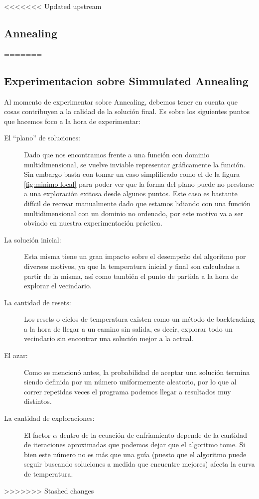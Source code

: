 <<<<<<< Updated upstream
\subsection{Annealing}
=======
\subsection{Experimentacion sobre Simmulated Annealing}

Al momento de experimentar sobre Annealing, debemos tener en cuenta que cosas contribuyen a la calidad de la solución final. Es sobre los siguientes puntos que hacemos foco a la hora de experimentar:

\begin{description}
\item[El “plano” de soluciones:] Dado que nos encontramos frente a una función con dominio multidimensional, se vuelve inviable representar gráficamente la función. Sin embargo basta con tomar un caso simplificado como el de la figura \ref{fig:minimo-local} para poder ver que la forma del plano puede no prestarse a una exploración exitosa desde algunos puntos. Este caso es bastante difícil de recrear manualmente dado que estamos lidiando con una función multidimensional con un dominio no ordenado, por este motivo va a ser obviado en nuestra experimentación práctica.

\item[La solución inicial:] Esta misma tiene un gran impacto sobre el desempeño del algoritmo por diversos motivos, ya que la temperatura inicial y final son calculadas a partir de la misma, así como también el punto de partida a la hora de explorar el vecindario. 

\item[La cantidad de resets:] Los resets o ciclos de temperatura existen como un método de backtracking a la hora de llegar a un camino sin salida, es decir, explorar todo un vecindario sin encontrar una solución mejor a la actual.

\item[El azar:] Como se mencionó antes, la probabilidad de aceptar una solución termina siendo definida por un número uniformemente aleatorio, por lo que al correr repetidas veces el programa podemos llegar a resultados muy distintos.

\item[La cantidad de exploraciones:] El factor $\alpha$ dentro de la ecuación de enfriamiento depende de la cantidad de iteraciones aproximadas que podemos dejar que el algoritmo tome. Si bien este número no es más que una guía (puesto que el algoritmo puede seguir buscando soluciones a medida que encuentre mejores) afecta la curva de temperatura. 

\end{description}
>>>>>>> Stashed changes
